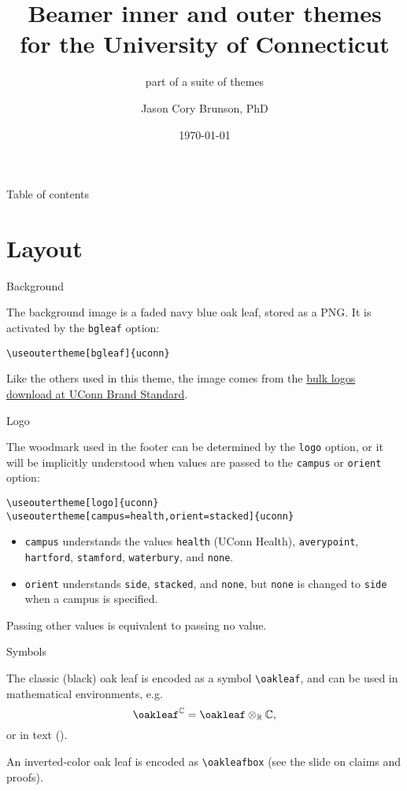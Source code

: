 \documentclass{beamer}
\title[Beamer inner and outer themes for UConn]{Beamer inner and outer themes\\ for the University of Connecticut}
\subtitle{part of a suite of themes}
\author[Cory Brunson]{Jason Cory Brunson, PhD}
\institute[UConn Health]{Center for Quantitative Medicine\\ University of Connecticut School of Medicine}
\date{\today}
\begin{document}
\begin{frame}
\titlepage
\end{frame}


\begin{frame}{Table of contents}
\tableofcontents
\end{frame}


\section{Layout}


\begin{frame}[fragile]{Background}

The background image is a faded navy blue oak leaf, stored as a PNG.
It is activated by the \verb|bgleaf| option:

\begin{verbatim}
\useoutertheme[bgleaf]{uconn}
\end{verbatim}

Like the others used in this theme, the image comes from the \href{https://brand.uconn.edu/downloads/logos/}{bulk logos download at UConn Brand Standard}.

\end{frame}


\begin{frame}[fragile]{Logo}

The woodmark used in the footer can be determined by the \verb|logo| option, or it will be implicitly understood when values are passed to the \verb|campus| or \verb|orient| option:

\begin{verbatim}
\useoutertheme[logo]{uconn}
\useoutertheme[campus=health,orient=stacked]{uconn}
\end{verbatim}

\begin{itemize}
\item \verb|campus| understands the values \verb|health| (UConn Health), \verb|averypoint|, \verb|hartford|, \verb|stamford|, \verb|waterbury|, and \verb|none|.
\item \verb|orient| understands \verb|side|, \verb|stacked|, and \verb|none|, but \verb|none| is changed to \verb|side| when a campus is specified.
\end{itemize}
Passing other values is equivalent to passing no value.

\end{frame}


\begin{frame}[fragile]{Symbols}

The classic (black) oak leaf is encoded as a symbol \verb|\oakleaf|, and can be used in mathematical environments, e.g.
\[\oakleaf^{\mathbb{C}}=\oakleaf\otimes_{\mathbb{R}}\mathbb{C}\text,\]
or in text (\oakleaf).

An inverted-color oak leaf is encoded as \verb|\oakleafbox| (see the slide on claims and proofs).

\end{frame}
\end{document}

